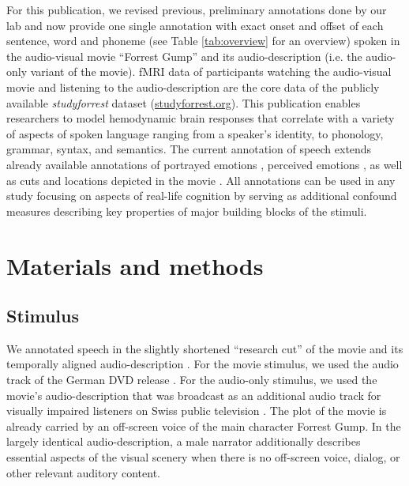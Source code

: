 \documentclass[10pt,a4paper,onecolumn]{article}
\begin{document}
For this publication, we revised previous, preliminary annotations done by our
lab and now provide one single annotation with exact onset and offset of each
sentence, word and phoneme (see Table \ref{tab:overview} for an overview) spoken
in the audio-visual movie ``Forrest Gump'' \citep{ForrestGumpMovie} and its
audio-description (i.e. the audio-only variant of the
movie)\citep{ForrestGumpGermanAD}.
fMRI data of participants watching the audio-visual movie
\citep{hanke2016simultaneous} and listening to the audio-description
\citep{hanke2014audiomovie} are the core data of the publicly available
\textit{studyforrest} dataset (\href{www.studyforrest.org}{studyforrest.org}).
This publication enables researchers to model hemodynamic brain responses that
correlate with a variety of aspects of spoken language ranging from a speaker's
identity, to phonology, grammar, syntax, and semantics.
The current annotation of speech extends already available annotations of
portrayed emotions \citep{labs2015portrayed}, perceived emotions
\citep{lettieri2019emotionotopy}, as well as cuts and locations depicted in the
movie \citep{haeusler2016annotation}. All annotations can be used in any study
focusing on aspects of real-life cognition by serving as additional confound
measures describing key properties of major building blocks of the stimuli.


\section*{Materials and methods} \subsection*{Stimulus}
We annotated speech in the slightly shortened ``research cut'' of the movie
\citep{hanke2016simultaneous} and its temporally aligned audio-description
\citep{hanke2014audiomovie}.
For the movie stimulus, we used the audio track of the German DVD release
\citep{ForrestGumpDVD}.
For the audio-only stimulus, we used the movie's audio-description that was
broadcast as an additional audio track for visually impaired listeners on Swiss
public television \citep{ForrestGumpGermanAD}.
The plot of the movie is already carried by an off-screen voice of the main
character Forrest Gump. In the largely identical audio-description, a male
narrator additionally describes essential aspects of the visual scenery when
there is no off-screen voice, dialog, or other relevant auditory content.
\end{document}
